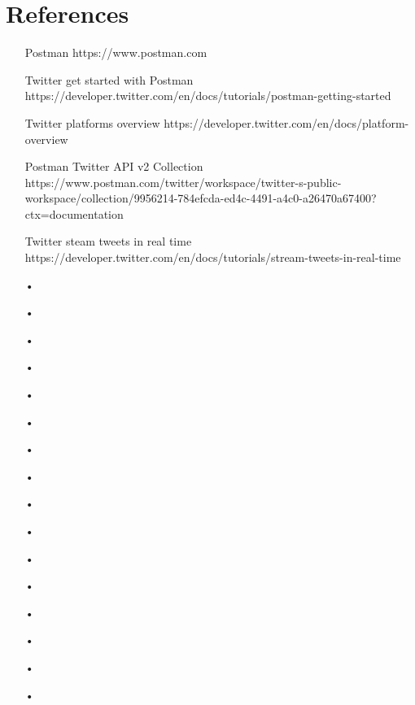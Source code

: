
\section{References}

\begin{enumerate}
	\item[Postman] https://www.postman.com
	\item[Twitter get started with Postman] https://developer.twitter.com/en/docs/tutorials/postman-getting-started 
	\item[Twitter platforms overview] https://developer.twitter.com/en/docs/platform-overview
	\item[Postman Twitter API v2 Collection] https://www.postman.com/twitter/workspace/twitter-s-public-workspace/collection/9956214-784efcda-ed4c-4491-a4c0-a26470a67400?ctx=documentation 
	\item[Twitter steam tweets in real time] https://developer.twitter.com/en/docs/tutorials/stream-tweets-in-real-time 
	\item[•] 
	\item[•] 
	\item[•] 
	\item[•] 
	\item[•] 
	\item[•] 
	\item[•] 
	\item[•] 
	\item[•] 
	\item[•] 
	\item[•] 
	\item[•] 
	\item[•] 
	\item[•] 
	\item[•] 
	\item[•] 
\end{enumerate}